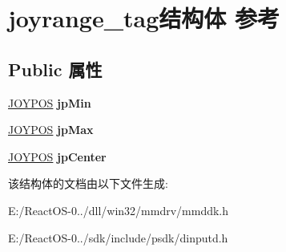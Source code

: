 \hypertarget{structjoyrange__tag}{}\section{joyrange\+\_\+tag结构体 参考}
\label{structjoyrange__tag}
\subsection*{Public 属性}
\begin{DoxyCompactItemize}
\item 
\mbox{\label{structjoyrange__tag_a8064c11a3af02554b95cf77f86cede02}} 
\hyperlink{structjoypos__tag}{J\+O\+Y\+P\+OS} {\bfseries jp\+Min}
\item 
\mbox{\label{structjoyrange__tag_a37e8bb432c5797c109114417d2b832e9}} 
\hyperlink{structjoypos__tag}{J\+O\+Y\+P\+OS} {\bfseries jp\+Max}
\item 
\mbox{\label{structjoyrange__tag_a347c83a09963df35f4b43392316b1758}} 
\hyperlink{structjoypos__tag}{J\+O\+Y\+P\+OS} {\bfseries jp\+Center}
\end{DoxyCompactItemize}


该结构体的文档由以下文件生成\+:\begin{DoxyCompactItemize}
\item 
E\+:/\+React\+O\+S-\/0../dll/win32/mmdrv/mmddk.\+h\item 
E\+:/\+React\+O\+S-\/0../sdk/include/psdk/dinputd.\+h\end{DoxyCompactItemize}
